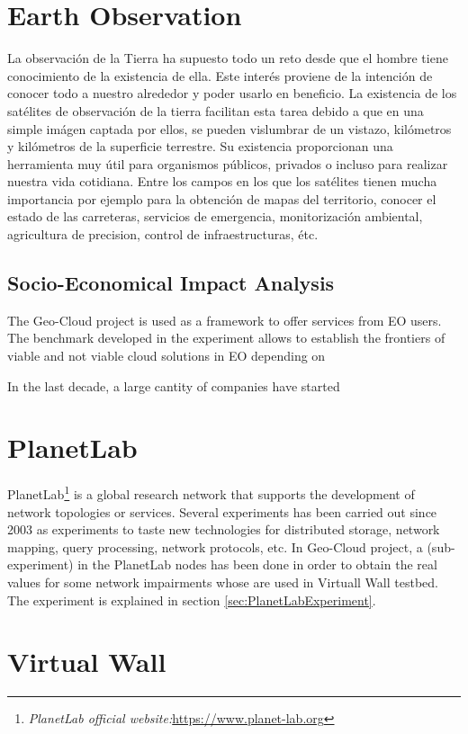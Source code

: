 \section{Earth Observation}

La observación de la Tierra ha supuesto todo un reto desde que el hombre tiene
conocimiento de la existencia de ella. Este interés proviene de la intención de
conocer todo a nuestro alrededor y poder usarlo en beneficio. 
La existencia de los satélites de observación
de la tierra facilitan esta tarea debido a que en una simple imágen captada por
ellos, se pueden vislumbrar de un vistazo, kilómetros y kilómetros de la
superficie terrestre. Su existencia proporcionan una herramienta muy útil para
organismos públicos, privados o incluso para realizar nuestra vida
cotidiana. Entre los campos en los que los satélites tienen mucha importancia
por ejemplo para la obtención de mapas del territorio, conocer el estado de las
carreteras, servicios de emergencia, monitorización ambiental, agricultura de
precision, control de infraestructuras, étc. 

\subsection{Socio-Economical Impact Analysis}

The Geo-Cloud project is used as a framework to offer services from EO
users. The benchmark developed in the experiment allows to establish the
frontiers of viable and not viable cloud solutions in EO depending on  

In the last decade, a large cantity of companies have started 
\section{PlanetLab}

PlanetLab\footnote{\emph{PlanetLab official website:}\url{https://www.planet-lab.org}} is
a global research network that supports the development of network topologies or
services. Several experiments has been carried out since 2003 as experiments to
taste new technologies for distributed storage, network mapping, query
processing, network protocols, etc.
In Geo-Cloud project, a (sub-experiment) in the PlanetLab nodes has been
done in order to obtain the real values for some network impairments whose are
used in Virtuall Wall testbed. The experiment is explained in section \ref{sec:PlanetLabExperiment}.

\section{Virtual Wall}


